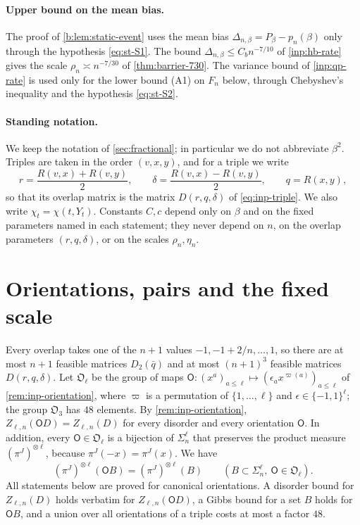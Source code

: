 \paragraph{Upper bound on the mean bias.} The proof of \cref{b:lem:static-event} uses the mean bias $\Delta_{n,\beta}=P_\beta-p_n(\beta)$ only through the hypothesis \eqref{eq:st-S1}. The bound $\Delta_{n,\beta}\le C_bn^{-7/10}$ of \cref{inp:hb-rate} gives the scale $\rho_n\asymp n^{-7/30}$ of \cref{thm:barrier-730}. The variance bound of \cref{inp:qp-rate} is used only for the lower bound (A1) on $F_n$ below, through Chebyshev's inequality and the hypothesis \eqref{eq:st-S2}.

\paragraph{Standing notation.} We keep the notation of \cref{sec:fractional}; in particular we do not abbreviate $\beta^2$. Triples are taken in the order $(v,x,y)$, and for a triple we write
\[
 r=\frac{R(v,x)+R(v,y)}2,\qquad\delta=\frac{R(v,x)-R(v,y)}2,\qquad q=R(x,y),
\]
so that its overlap matrix is the matrix $D(r,q,\delta)$ of \eqref{eq:inp-triple}. We also write $\chi_t=\chi(t,Y_t)$. Constants $C,c$ depend only on $\beta$ and on the fixed parameters named in each statement; they never depend on $n$, on the overlap parameters $(r,q,\delta)$, or on the scales $\rho_n,\eta_n$.

\section{Orientations, pairs and the fixed scale}\label{sec:st-pair-fixed}

Every overlap takes one of the $n+1$ values $-1,-1+2/n,\dots,1$, so there are at most $n+1$ feasible matrices $D_2(\bar q)$ and at most $(n+1)^3$ feasible matrices $D(r,q,\delta)$. Let $\mathfrak O_\ell$ be the group of maps $\mathsf O\colon(x^a)_{a\le\ell}\mapsto(\epsilon_ax^{\varpi(a)})_{a\le\ell}$ of \cref{rem:inp-orientation}, where $\varpi$ is a permutation of $\{1,\dots,\ell\}$ and $\epsilon\in\{-1,1\}^\ell$; the group $\mathfrak O_3$ has $48$ elements. By \cref{rem:inp-orientation}, $Z_{\ell,n}(\mathsf OD)=Z_{\ell,n}(D)$ for every disorder and every orientation $\mathsf O$. In addition, every $\mathsf O\in\mathfrak O_\ell$ is a bijection of $\Sigma_n^\ell$ that preserves the product measure $(\pi^J)^{\otimes\ell}$, because $\pi^J(-x)=\pi^J(x)$. We have
\begin{equation}\label{eq:st-orientation}
 (\pi^J)^{\otimes\ell}(\mathsf OB)=(\pi^J)^{\otimes\ell}(B)\qquad(B\subset\Sigma_n^\ell,\ \mathsf O\in\mathfrak O_\ell).
\end{equation}
All statements below are proved for canonical orientations. A disorder bound for $Z_{\ell,n}(D)$ holds verbatim for $Z_{\ell,n}(\mathsf OD)$, a Gibbs bound for a set $B$ holds for $\mathsf OB$, and a union over all orientations of a triple costs at most a factor $48$.

